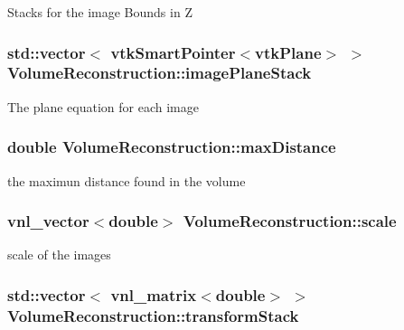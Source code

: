 Stacks for the image Bounds in Z \hypertarget{class_volume_reconstruction_a3ff58286a3dded49e06408d2ff60bb67}{
\subsubsection[{image\-Plane\-Stack}]{\setlength{\rightskip}{0pt plus 5cm}std\-::vector$<$ vtk\-Smart\-Pointer$<$vtk\-Plane$>$ $>$ {\bf Volume\-Reconstruction\-::image\-Plane\-Stack}}}\label{d0/d82/class_volume_reconstruction_a3ff58286a3dded49e06408d2ff60bb67}
The plane equation for each image \hypertarget{class_volume_reconstruction_a05a3b2bff77b320303dc6ca1e8a94cad}{
\subsubsection[{max\-Distance}]{\setlength{\rightskip}{0pt plus 5cm}double {\bf Volume\-Reconstruction\-::max\-Distance}}}\label{d0/d82/class_volume_reconstruction_a05a3b2bff77b320303dc6ca1e8a94cad}
the maximun distance found in the volume \hypertarget{class_volume_reconstruction_a6911c1ecd44ed6cc11f73740db81f6c0}{
\subsubsection[{scale}]{\setlength{\rightskip}{0pt plus 5cm}vnl\-\_\-vector$<$double$>$ {\bf Volume\-Reconstruction\-::scale}}}\label{d0/d82/class_volume_reconstruction_a6911c1ecd44ed6cc11f73740db81f6c0}
scale of the images \hypertarget{class_volume_reconstruction_a4be301f984c70fa431aa176535882eca}{
\subsubsection[{transform\-Stack}]{\setlength{\rightskip}{0pt plus 5cm}std\-::vector$<$ vnl\-\_\-matrix$<$double$>$ $>$ {\bf Volume\-Reconstruction\-::transform\-Stack}}}\label{d0/d82/class_volume_reconstruction_a4be301f984c70fa431aa176535882eca}
